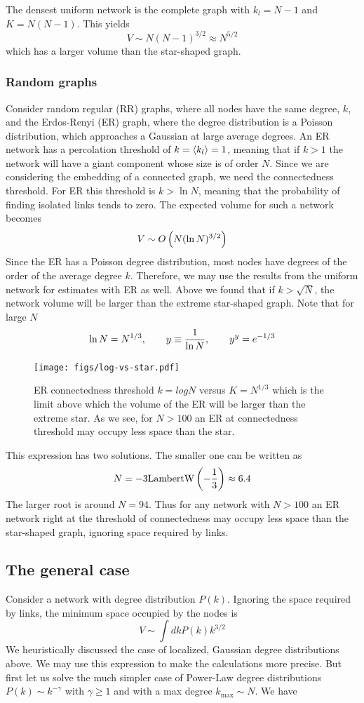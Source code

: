 \documentclass[nofootinbib,preprint,floatfix,titlepage,superscriptaddress]{revtex4} %
\begin{document}
The densest uniform network is the complete graph with $k_l=N-1$ and $K= N(N-1)$. This yields
\[V \sim N(N-1)^{3/2} \approx N^{5/2}\]
which has a larger volume than the star-shaped graph. 
\subsubsection{Random graphs}
Consider random regular (RR) graphs, where all nodes have the same degree, $k$, and the Erdos-Renyi (ER) graph, where the degree distribution is a Poisson distribution, which approaches a Gaussian at large average degrees. An ER network has a percolation threshold of $k = \left<k_l\right> = 1 $, meaning that if $k>1$ the network will have a giant component whose size is of order $N$. Since we are considering the embedding of a connected graph, we need the connectedness threshold. For ER this threshold is\cite{erdos1960connected} $k > \ln N$, meaning that the probability of finding isolated links tends to zero. The expected volume for such a network becomes
\begin{equation}
    V \sim O\left(N (\ln N)^{3/2}\right)
\end{equation}
Since the ER has a Poisson degree distribution, most nodes have degrees of the order of the average degree $k$. Therefore, we may use the results from the uniform network for estimates with ER as well.  
Above we found that if $k> \sqrt{N}$, the network volume will be larger than the extreme star-shaped graph. Note that for large $N$ 
\begin{align}
    \ln N  = N^{1/3},\qquad 
    y  \equiv {1\over \ln N},\qquad    
    y^y = e^{-1/3}
\end{align}
\begin{figure}
    \centering
    \texttt{[image: figs/log-vs-star.pdf]}
    \caption{ER connectedness threshold $k= log N$  versus $K = N^{1/3}$ which is the limit above which the volume of the ER will be larger than the extreme star.  As we see, for $N>100$ an ER at connectedness threshold may occupy less space than the star.}
    \label{fig:logstar}
\end{figure}
This expression has two solutions. The smaller one can be written as 
$$ N = -3 \mathrm{LambertW}\left(-{1\over 3}\right) \approx 6.4 $$ 
The larger root is around $N = 94$. Thus for any network with $N >100$ an ER network right at the threshold of connectedness may occupy less space than the star-shaped graph, ignoring space required by links. 

\subsection{The general case}
Consider a network with degree distribution $P(k)$. Ignoring the space required by links, the minimum space occupied by the nodes is 
\[V \sim \int dk P(k) k^{3/2} \]
We heuristically discussed the case of localized, Gaussian degree distributions above. We may use this expression to make the calculations more precise. But first let us solve the much simpler case of Power-Law degree distributions $P(k) \sim k^{-\gamma}$ with $\gamma \geq 1$ and with a max degree $k_{\mathrm{max}} \sim N$. We have
\end{document}
